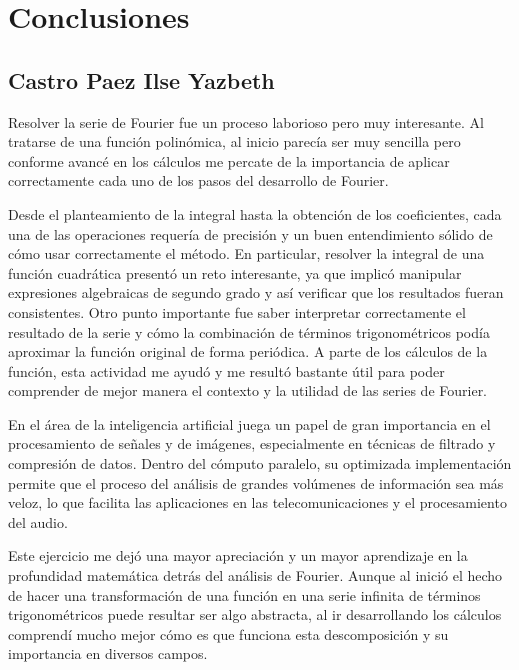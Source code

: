 \chapter[Conclusiones]{Conclusiones}
\label{cp:latex-tutorial}

{
\setlength{\parskip}{1\baselineskip}
\parindent0pt

\newpage

\section{Castro Paez Ilse Yazbeth}

Resolver la serie de Fourier fue un proceso laborioso pero muy interesante. Al tratarse de una función polinómica, al inicio parecía ser muy sencilla pero conforme avancé en los cálculos  me percate de la importancia de aplicar correctamente cada uno de los pasos del desarrollo de Fourier. 

Desde el planteamiento de la integral hasta la obtención de los coeficientes, cada una de las operaciones requería de precisión y un buen entendimiento sólido de cómo usar correctamente el método. En particular, resolver la integral de una función cuadrática presentó un reto interesante, ya que implicó manipular expresiones algebraicas de segundo grado y así verificar que los resultados fueran consistentes. Otro punto importante fue saber interpretar correctamente el resultado de la serie y cómo la combinación de términos trigonométricos podía aproximar la función original de forma periódica. A parte de los cálculos de la función, esta actividad me ayudó y me resultó bastante útil para poder comprender de mejor manera el contexto y la utilidad de las series de Fourier. 

En el área de la inteligencia artificial juega un papel de gran importancia en el procesamiento de señales y de imágenes, especialmente en técnicas de filtrado y compresión de datos. Dentro del cómputo paralelo, su optimizada implementación permite que el proceso del análisis de grandes volúmenes de información sea más veloz, lo que facilita las aplicaciones en las telecomunicaciones y el procesamiento del audio.

Este ejercicio me dejó una mayor apreciación y un mayor aprendizaje en la profundidad matemática detrás del análisis de Fourier. Aunque al inició el hecho de hacer una transformación de una función en una serie infinita de términos trigonométricos puede resultar ser algo abstracta, al ir desarrollando los cálculos comprendí mucho mejor cómo es que funciona esta descomposición y su importancia en diversos campos. 

}
